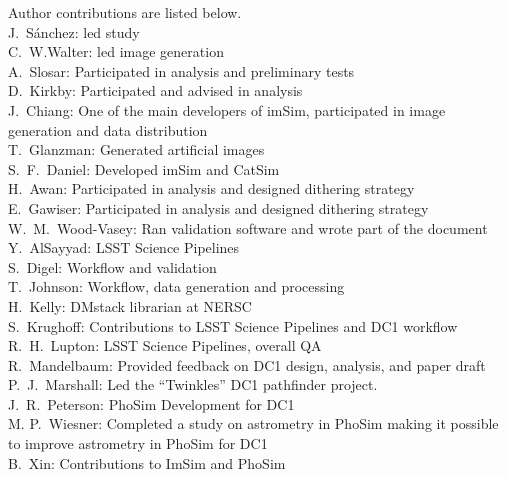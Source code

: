Author contributions are listed below. \\
J.~S\'{a}nchez: led study \\
C.~W.Walter: led image generation \\
A.~Slosar: Participated in analysis and preliminary tests \\
D.~Kirkby: Participated and advised in analysis \\
J.~Chiang: One of the main developers of imSim, participated in image generation and data distribution \\
T.~Glanzman: Generated artificial images \\
S.~F.~Daniel: Developed imSim and CatSim \\
H.~Awan: Participated in analysis and designed dithering strategy \\
E.~Gawiser: Participated in analysis and designed dithering strategy \\
W.~M.~Wood-Vasey: Ran validation software and wrote part of the document \\
Y.~AlSayyad: LSST Science Pipelines \\
S.~Digel: Workflow and validation \\
T.~Johnson: Workflow, data generation and processing \\
H.~Kelly: DMstack librarian at NERSC \\
S.~Krughoff: Contributions to LSST Science Pipelines and DC1 workflow \\
R.~H.~Lupton: LSST Science Pipelines, overall QA \\
R.~Mandelbaum: Provided feedback on DC1 design, analysis, and paper draft \\
P.~J.~Marshall: Led the ``Twinkles'' DC1 pathfinder project. \\
J.~R.~Peterson: PhoSim Development for DC1 \\
M. P.~Wiesner: Completed a study on astrometry in PhoSim making it possible to improve astrometry in PhoSim for DC1 \\
B.~Xin: Contributions to ImSim and PhoSim \\
